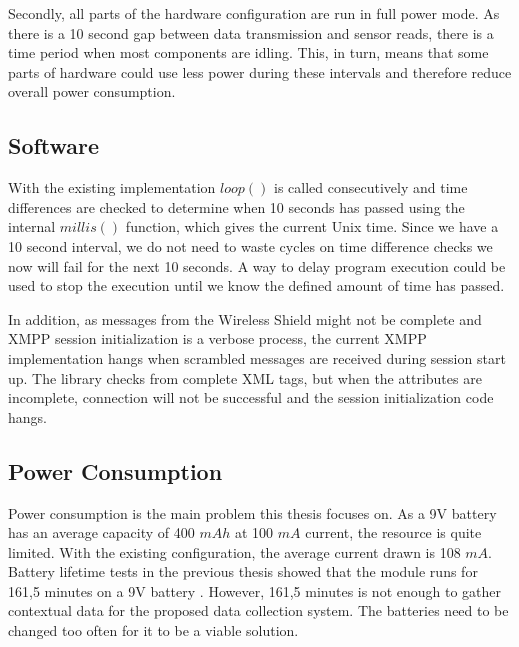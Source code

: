 Secondly, all parts of the hardware configuration are run in full power mode. As there is a 10 second gap between data transmission and sensor reads, there is a time period when most components are idling. This, in turn, means that some parts of hardware could use less power during these intervals and therefore reduce overall power consumption.

\subsection{Software}

With the existing implementation $loop()$ is called consecutively and time differences are checked to determine when 10 seconds has passed using the internal $millis()$ function, which gives the current Unix time. Since we have a 10 second interval, we do not need to waste cycles on time difference checks we now will fail for the next 10 seconds. A way to delay program execution could be used to stop the execution until we know the defined amount of time has passed. 

In addition, as messages from the Wireless Shield might not be complete and  XMPP session initialization is a verbose process, the current XMPP implementation hangs when scrambled messages are received during session start up. The library checks from complete XML tags, but when the attributes are incomplete, connection will not be successful and the session initialization code hangs.

\subsection{Power Consumption}

Power consumption is the main problem this thesis focuses on. As a 9V battery has an average capacity of 400 $mAh$ at 100 $mA$ current, the resource is quite limited. With the existing configuration, the average current drawn is 108 $mA$. Battery lifetime tests in the previous thesis showed that the module runs for 161,5 minutes on a 9V battery \cite[p. 50]{prev_thesis}. However, 161,5 minutes is not enough to gather contextual data for the proposed data collection system. The batteries need to be changed too often for it to be a viable solution. 



